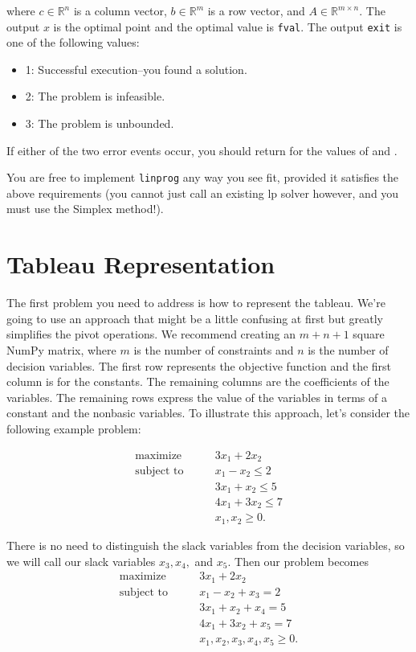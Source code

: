 where $c \in \mathbb{R}^n$ is a column vector, $b \in \mathbb{R}^m$ is a row vector, and $A \in \mathbb{R}^{m \times n}$.
The output $x$ is the optimal point and the optimal value is {\tt fval}.
The output {\tt exit} is one of the following values:
\begin{itemize}
\item 1: Successful execution--you found a solution.
\item 2: The problem is infeasible.
\item 3: The problem is unbounded.
\end{itemize}
If either of the two error events occur, you should return  for the values of  and .

You are free to implement {\tt linprog} any way you see fit, provided it satisfies the above requirements (you cannot just call an existing lp solver however, and you must use the Simplex method!).

\section*{Tableau Representation}

The first problem you need to address is how to represent the tableau.
We're going to use an approach that might be a little confusing at first but greatly simplifies the pivot operations.
We recommend creating an $m + n + 1$ square NumPy matrix, where $m$ is the number of constraints and $n$ is the number of decision variables.
The first row represents the objective function and the first column is for the constants.
The remaining columns are the coefficients of the variables.
The remaining rows express the value of the variables in terms of a constant and the nonbasic variables.
To illustrate this approach, let's consider the following example problem:

\begin{align*}
	\mbox{maximize}\qquad
        &    3x_1 + 2x_2 \\
	\mbox{subject to}\qquad
        &     x_1 - x_2 \leq 2 \\
		&	 3x_1 + x_2 \leq 5 \\
		&	 4x_1 + 3x_2 \leq 7 \\
		&     x_1, x_2 \geq 0.
\end{align*}

There is no need to distinguish the slack variables from the decision variables, so we will call our slack variables $x_3, x_4,$ and $x_5$.
Then our problem becomes
\begin{align*}
	\mbox{maximize}\qquad
        &    3x_1 + 2x_2 \\
	\mbox{subject to}\qquad
        &     x_1 - x_2 + x_3 = 2 \\
		&	 3x_1 + x_2 + x_4 = 5 \\
		&	 4x_1 + 3x_2 + x_5 = 7 \\
		&     x_1, x_2, x_3, x_4, x_5 \geq 0.
\end{align*}

